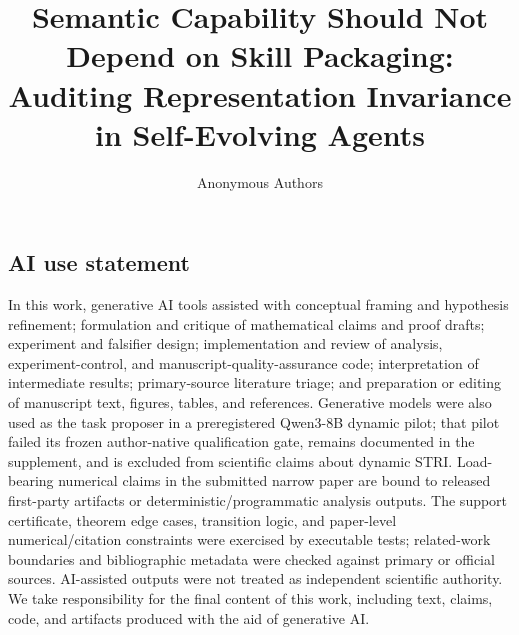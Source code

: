 \documentclass{article}
\title{Semantic Capability Should Not Depend on Skill Packaging:\\Auditing Representation Invariance in Self-Evolving Agents}
\author{Anonymous Authors}
\begin{document}
\maketitle



\clearpage
\label{stri:post-main-page}

\subsection*{AI use statement}
In this work, generative AI tools assisted with conceptual framing and hypothesis refinement; formulation and critique of mathematical claims and proof drafts; experiment and falsifier design; implementation and review of analysis, experiment-control, and manuscript-quality-assurance code; interpretation of intermediate results; primary-source literature triage; and preparation or editing of manuscript text, figures, tables, and references. Generative models were also used as the task proposer in a preregistered Qwen3-8B dynamic pilot; that pilot failed its frozen author-native qualification gate, remains documented in the supplement, and is excluded from scientific claims about dynamic STRI. Load-bearing numerical claims in the submitted narrow paper are bound to released first-party artifacts or deterministic/programmatic analysis outputs. The support certificate, theorem edge cases, transition logic, and paper-level numerical/citation constraints were exercised by executable tests; related-work boundaries and bibliographic metadata were checked against primary or official sources. AI-assisted outputs were not treated as independent scientific authority. We take responsibility for the final content of this work, including text, claims, code, and artifacts produced with the aid of generative AI.
\end{document}
